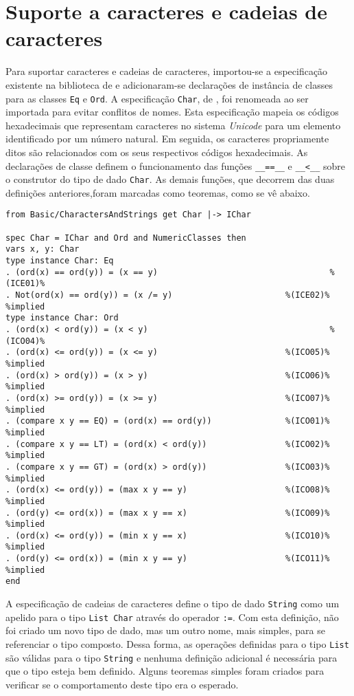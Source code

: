 \section{Suporte a caracteres e cadeias de caracteres}
Para suportar caracteres e cadeias de caracteres, importou-se a especificação existente na biblioteca de \CASL e adicionaram-se declarações de instância de classes para as classes \Verb.Eq. e \Verb.Ord..
A especificação \Verb.Char., de \CASL, foi renomeada ao ser importada para evitar conflitos de nomes.
Esta especificação mapeia os códigos hexadecimais que representam caracteres no sistema \textit{Unicode} para um elemento identificado por um número natural.
Em seguida, os caracteres propriamente ditos são relacionados com os seus respectivos códigos hexadecimais.
As declarações de classe definem o funcionamento das funções \Verb.__==__. e \Verb.__<__. sobre o construtor do tipo de dado \Verb.Char..
As demais funções, que decorrem das duas definições anteriores,foram marcadas como teoremas, como se vê abaixo.

\begin{Verbatim}
from Basic/CharactersAndStrings get Char |-> IChar

spec Char = IChar and Ord and NumericClasses then
vars x, y: Char
type instance Char: Eq                             
. (ord(x) == ord(y)) = (x == y)                                   %(ICE01)%
. Not(ord(x) == ord(y)) = (x /= y)                       %(ICE02)% %implied
type instance Char: Ord                                  
. (ord(x) < ord(y)) = (x < y)                                     %(ICO04)%
. (ord(x) <= ord(y)) = (x <= y)                          %(ICO05)% %implied
. (ord(x) > ord(y)) = (x > y)                            %(ICO06)% %implied
. (ord(x) >= ord(y)) = (x >= y)                          %(ICO07)% %implied
. (compare x y == EQ) = (ord(x) == ord(y))               %(ICO01)% %implied
. (compare x y == LT) = (ord(x) < ord(y))                %(ICO02)% %implied
. (compare x y == GT) = (ord(x) > ord(y))                %(ICO03)% %implied
. (ord(x) <= ord(y)) = (max x y == y)                    %(ICO08)% %implied
. (ord(y) <= ord(x)) = (max x y == x)                    %(ICO09)% %implied
. (ord(x) <= ord(y)) = (min x y == x)                    %(ICO10)% %implied
. (ord(y) <= ord(x)) = (min x y == y)                    %(ICO11)% %implied
end
\end{Verbatim}

A especificação de cadeias de caracteres define o tipo de dado \Verb.String. como um apelido para o tipo \Verb.List Char. através do operador \Verb.:=..
Com esta definição, não foi criado um novo tipo de dado, mas um outro nome, mais simples, para se referenciar o tipo composto.
Dessa forma, as operações definidas para o tipo \Verb.List. são válidas para o tipo \Verb.String. e nenhuma definição adicional é necessária para que o tipo esteja bem definido.
Alguns teoremas simples foram criados para verificar se o comportamento deste tipo era o esperado.

